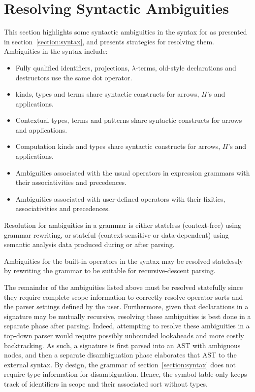 \section{Resolving Syntactic Ambiguities}\label{section:resolving-grammar-ambiguities}

This section highlights some syntactic ambiguities in the syntax for \Beluga as presented in section~\ref{section:syntax}, and presents strategies for resolving them.
Ambiguities in the syntax include:
\begin{itemize}
\item Fully qualified identifiers, projections, $\lambda$-terms, old-style \LF declarations and destructors use the same dot operator.
\item \LF kinds, types and terms share syntactic constructs for arrows, $ \Pi $'s and applications.
\item Contextual \LF types, terms and patterns share syntactic constructs for arrows and applications.
\item Computation kinds and types share syntactic constructs for arrows, $ \Pi $'s and applications.
\item Ambiguities associated with the usual operators in expression grammars with their associativities and precedences.
\item Ambiguities associated with user-defined operators with their fixities, associativities and precedences.
\end{itemize}

Resolution for ambiguities in a grammar is either stateless (context-free) using grammar rewriting, or stateful (context-sensitive or data-dependent) using semantic analysis data produced during or after parsing.

Ambiguities for the built-in operators in the syntax may be resolved statelessly by rewriting the grammar to be suitable for recursive-descent parsing.

The remainder of the ambiguities listed above must be resolved statefully since they require complete scope information to correctly resolve operator sorts and the parser settings defined by the user.
Furthermore, given that declarations in a \Beluga signature may be mutually recursive, resolving these ambiguities is best done in a separate phase after parsing.
Indeed, attempting to resolve these ambiguities in a top-down parser would require possibly unbounded lookaheads and more costly backtracking.
As such, a \Beluga signature is first parsed into an \ac{AST} with ambiguous nodes, and then a separate disambiguation phase elaborates that \ac{AST} to the external syntax.
By design, the grammar of section~\ref{section:syntax} does not require type information for disambiguation.
Hence, the symbol table only keeps track of identifiers in scope and their associated sort without types.

